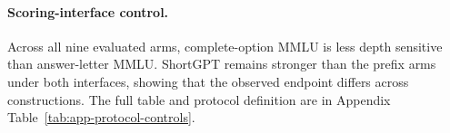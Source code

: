 \paragraph{Scoring-interface control.}
Across all nine evaluated arms, complete-option MMLU is less depth sensitive than
answer-letter MMLU. ShortGPT remains stronger than the prefix arms under both
interfaces, showing that the observed endpoint differs across constructions.
The full table and
protocol definition are in Appendix Table~\ref{tab:app-protocol-controls}.
